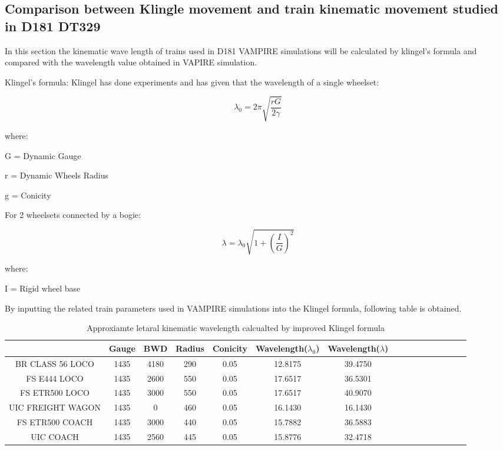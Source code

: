 \subsection{Comparison between Klingle movement and train kinematic movement studied in D181 DT329}

In this section the kinematic wave length of trains used in D181 VAMPIRE simulations will be calculated by klingel's formula and compared with the wavelength value obtained in VAPIRE simulation.

Klingel's formula:
Klingel has done experiments and has given that the wavelength of a single wheelset:

$$ \lambda_0 = 2 \pi \sqrt{\frac{rG}{2\gamma} }$$

where:

G = Dynamic Gauge

r = Dynamic Wheels Radius

g = Conicity

For 2 wheelsets connected by a bogie:

$$ \lambda = \lambda_0 \sqrt{1+(\frac{I}{G})^2}  $$

where:

I = Rigid wheel base

By inputting the related train parameters used in VAMPIRE simulations into the Klingel formula, following table is obtained.

\begin{table}[h]
  \centering
  \caption{Approxiamte letaral kinematic wavelength calcualted by improved Klingel formula}
    \begin{tabular}{cccccccccccccccc}
    \toprule
    & Gauge & BWD & Radius & Conicity & Wavelength($\lambda_0$) &Wavelength($\lambda$) & \\
    \midrule
    BR CLASS 56 LOCO  & 1435 & 4180 & 290 & 0.05 & 12.8175 & 39.4750 \\
    FS E444 LOCO  & 1435 & 2600 & 550 & 0.05 & 17.6517 & 36.5301 \\
    FS ETR500 LOCO  & 1435 & 3000 & 550 & 0.05 & 17.6517 & 40.9070\\
    UIC FREIGHT WAGON  & 1435 & 0 & 460 & 0.05 & 16.1430 & 16.1430 \\
    FS ETR500 COACH  & 1435 & 3000 & 440 & 0.05 & 15.7882 & 36.5883 & \\
    UIC COACH  & 1435 & 2560 & 445 & 0.05 & 15.8776 & 32.4718 &  \\
    \bottomrule
    \end{tabular}%
  \label{tab:wavelengthkinematic}%
\end{table}%


